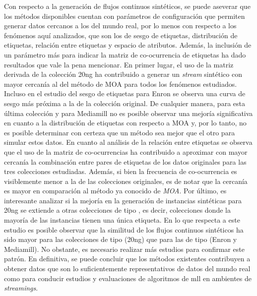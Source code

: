 Con respecto a la generación de flujos continuos sintéticos, se puede aseverar
que los métodos disponibles cuentan con parámetros de configuración que permiten
generar datos cercanos a los del mundo real, por lo menos con respecto a los
fenómenos aquí analizados, que son los de sesgo de etiquetas, distribución de
etiquetas, relación entre etiquetas y espacio de atributos.  Además, la
inclusión de un parámetro más para indicar la matriz de co-ocurrencia de
etiquetas ha dado resultados que vale la pena mencionar. En primer lugar, el uso
de la matriz derivada de la colección 20ng ha contribuido a generar un
\textit{stream} sintético con mayor cercanía al del método de MOA para todos los
fenómenos estudiados. Incluso en el estudio del sesgo de etiquetas para Enron se
observa una curva de sesgo más próxima a la de la colección original. De
cualquier manera, para esta última colección y para Mediamill no es posible
observar una mejoría significativa en cuanto a la distribución de etiquetas con
respecto a MOA y, por lo tanto, no es posible determinar con certeza que un
método sea mejor que el otro para simular estos datos. En cuanto al análisis de
la relación entre etiquetas se observa que el uso de la matriz de co-ocurrencias
ha contribuido a aproximar con mayor cercanía la combinación entre pares de
etiquetas de los datos originales para las tres colecciones estudiadas. Además,
si bien la frecuencia de co-ocurrencia es visiblemente menor a la de las
colecciones originales, es de notar que la cercanía es mayor en comparación al
método ya conocido de \textit{MOA}\@. Por último, es interesante analizar si la
mejoría en la generación de instancias sintéticas para 20ng se extiende a otras
colecciones de tipo , es decir, colecciones donde la mayoría de las
instancias tienen una única etiqueta. En lo que respecta a este estudio es
posible observar que la similitud de los flujos continuos sintéticos ha sido
mayor para las colecciones de tipo  (20ng) que para las de tipo
 (Enron y Mediamill). No obstante, es necesario realizar más
estudios para confirmar este patrón.  En definitiva, se puede concluir que los
métodos existentes contribuyen a obtener datos que son lo suficientemente
representativos de datos del mundo real como para conducir estudios y
evaluaciones de algoritmos de \acrshort{mll} en ambientes de
\textit{streamings}.

